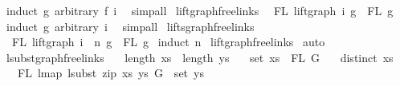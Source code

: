 \begin{isabellebody}
%
\isadelimproof
%
\endisadelimproof
%
\isatagproof
{}\isamarkupfalse%
\ {\isacharparenleft}{\kern0pt}induct\ g\ arbitrary{\isacharcolon}{\kern0pt}\ f\ i{\isacharparenright}{\kern0pt}\ \isamarkupfalse%
\ simp{\isacharunderscore}{\kern0pt}all%
\endisatagproof
{\isafoldproof}%
%
\isadelimproof
\isanewline
%
\endisadelimproof
\isanewline
\isanewline
{}\isamarkupfalse%
\ lift{\isacharunderscore}{\kern0pt}graph{\isacharunderscore}{\kern0pt}freelinks{\isacharcolon}{\kern0pt}\isanewline
\ \ {\isachardoublequoteopen}FL\ {\isacharparenleft}{\kern0pt}lift{\isacharunderscore}{\kern0pt}graph\ i\ g{\isacharparenright}{\kern0pt}\ {\isacharequal}{\kern0pt}\ FL\ g{\isachardoublequoteclose}\isanewline
%
\isadelimproof
%
\endisadelimproof
%
\isatagproof
{}\isamarkupfalse%
\ {\isacharparenleft}{\kern0pt}induct\ g\ arbitrary{\isacharcolon}{\kern0pt}\ i{\isacharparenright}{\kern0pt}\ \isamarkupfalse%
\ simp{\isacharunderscore}{\kern0pt}all%
\endisatagproof
{\isafoldproof}%
%
\isadelimproof
\isanewline
%
\endisadelimproof
\isanewline
\isanewline
{}\isamarkupfalse%
\ lifts{\isacharunderscore}{\kern0pt}graph{\isacharunderscore}{\kern0pt}freelinks{\isacharcolon}{\kern0pt}\isanewline
\ \ {\isachardoublequoteopen}FL\ {\isacharparenleft}{\kern0pt}{\isacharparenleft}{\kern0pt}lift{\isacharunderscore}{\kern0pt}graph\ i\ {\isacharcircum}{\kern0pt}{\isacharcircum}{\kern0pt}\ n{\isacharparenright}{\kern0pt}\ g{\isacharparenright}{\kern0pt}\ {\isacharequal}{\kern0pt}\ FL\ g{\isachardoublequoteclose}\isanewline
%
\isadelimproof
%
\endisadelimproof
%
\isatagproof
{}\isamarkupfalse%
\ {\isacharparenleft}{\kern0pt}induct\ n{\isacharparenright}{\kern0pt}\isanewline
{}\isamarkupfalse%
\ lift{\isacharunderscore}{\kern0pt}graph{\isacharunderscore}{\kern0pt}freelinks\isanewline
{}\isamarkupfalse%
\ auto%
\endisatagproof
{\isafoldproof}%
%
\isadelimproof
\isanewline
%
\endisadelimproof
\isanewline
{}\isamarkupfalse%
\ lsubst{\isacharunderscore}{\kern0pt}graph{\isacharunderscore}{\kern0pt}freelinks{\isacharcolon}{\kern0pt}\isanewline
\ \ \ {\isachardoublequoteopen}length\ xs\ {\isacharequal}{\kern0pt}\ length\ ys{\isachardoublequoteclose}\isanewline
\ \ \ {\isachardoublequoteopen}set\ xs\ {\isacharequal}{\kern0pt}\ FL\ G{\isachardoublequoteclose}\isanewline
\ \ \ {\isachardoublequoteopen}distinct\ xs{\isachardoublequoteclose}\isanewline
\ \ \ {\isachardoublequoteopen}FL\ {\isacharparenleft}{\kern0pt}lmap\ {\isacharparenleft}{\kern0pt}lsubst\ {\isacharparenleft}{\kern0pt}zip\ xs\ ys{\isacharparenright}{\kern0pt}{\isacharparenright}{\kern0pt}\ G{\isacharparenright}{\kern0pt}\ {\isacharequal}{\kern0pt}\ set\ ys{\isachardoublequoteclose}\isanewline

\end{isabellebody}
